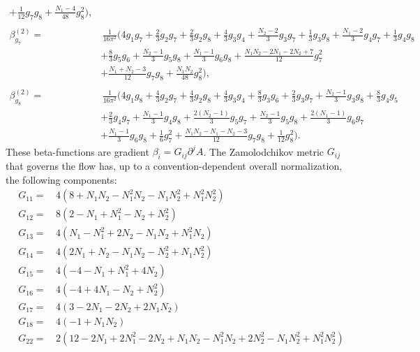 \begin{subappendices}
\begin{align}
+ \frac{1}{12}g_7 g_8 
+ \frac{N_1-4}{48} g_8^2 
\bigg),
\\ \nonumber
\\
\beta_{g_7}^{(2)}
=&\,
\frac{1}{16\pi^2}
\bigg(
4 g_1 g_7 
+ \frac{2}{3} g_2 g_7 
+ \frac{2}{3} g_2 g_8 
+ \frac{4}{3} g_3 g_4 
+ \frac{N_2-2}{3} g_3 g_7  
+ \frac{1}{3} g_3 g_8 
+ \frac{N_1-2}{3} g_4 g_7 
+ \frac{1}{3}g_4 g_8 
\nonumber \\ & 
+ \frac{8}{3} g_5 g_6 
+ \frac{N_2-1}{3} g_5 g_8 
+ \frac{N_1-1}{3} g_6 g_8 
+ \frac{N_1 N_2-2N_1-2N_2+7}{12} g_7^2 
\nonumber \\ & 
+ \frac{N_1+N_2-3}{12} g_7 g_8 
+ \frac{N_1 N_2}{48} g_8^2 
\bigg), 
\\ \nonumber
\\ 
\beta_{g_8}^{(2)}
=&\,
\frac{1}{16\pi^2}
\bigg(
4 g_1 g_8 
+ \frac{4}{3} g_2 g_7 
+ \frac{4}{3} g_2 g_8
+ \frac{4}{3} g_3 g_4 
+ \frac{8}{3} g_3 g_6 
+ \frac{2}{3} g_3 g_7 
+ \frac{N_2-1}{3} g_3 g_8
+ \frac{8}{3} g_4 g_5 
\nonumber \\ & 
+ \frac{2}{3} g_4 g_7 
+ \frac{N_1-1}{3} g_4 g_8 
+ \frac{2(N_2-1)}{3} g_5 g_7 
+ \frac{N_2-1}{3} g_5 g_8 
+ \frac{2(N_1-1)}{3} g_6 g_7 
\nonumber \\ & 
+ \frac{N_1-1}{3} g_6 g_8 
+ \frac{1}{6}g_7^2 
+ \frac{N_1 N_2-N_1-N_2-3}{12} g_7 g_8
+ \frac{1}{12}g_8^2 
\bigg). \label{eq:beta8}
\end{align}
\endgroup
These beta-functions are gradient $\beta_i = G_{ij}\partial^j A$. The Zamolodchikov metric $G_{ij}$ that governs the flow has, up to a convention-dependent overall normalization, the following components:
\begingroup
\allowdisplaybreaks
\begin{align}
G_{11}=\,&4 (8 + N_1 N_2 - N_1^2 N_2 - N_1 N_2^2 + N_1^2 N_2^2)
\nonumber \\
G_{12}=\,&8 (2 - N_1 + N_1^2 - N_2 + N_2^2)
\nonumber \\
G_{13}=\,&4 (N_1 - N_1^2 + 2 N_2 - N_1 N_2 + N_1^2 N_2)
\nonumber \\
G_{14}=\,&4 (2 N_1 + N_2 - N_1 N_2 - N_2^2 + N_1 N_2^2)
\nonumber \\
G_{15}=\,&4 (-4 - N_1 + N_1^2 + 4 N_2)
\nonumber \\
G_{16}=\,&4 (-4 + 4 N_1 - N_2 + N_2^2)
\nonumber \\
G_{17}=\,&4 (3 - 2 N_1 - 2 N_2 + 2 N_1 N_2)
\nonumber \\
G_{18}=\,& 4 (-1 + N_1 N_2)
\nonumber \\
G_{22}=\,&2 (12 - 2 N_1 + 2 N_1^2 - 2 N_2 + N_1 N_2 - N_1^2 N_2 + 2 N_2^2 - N_1 N_2^2 + N_1^2 N_2^2)

\end{align}
\end{subappendices}
